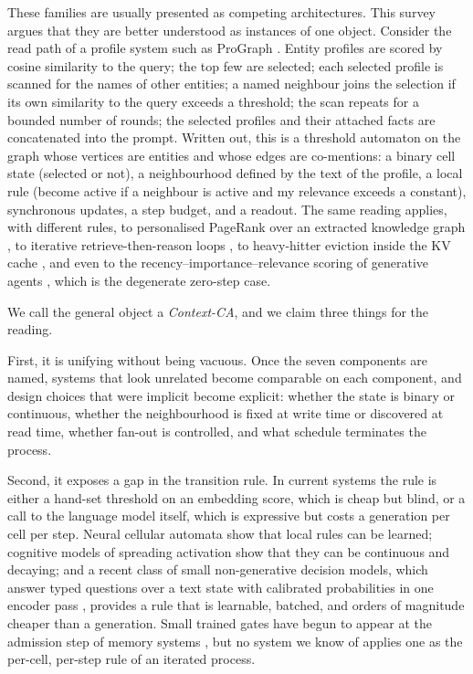 \documentclass[11pt]{article}
\begin{document}
These families are usually presented as competing architectures. This survey argues that they are better understood as instances of one object. Consider the read path of a profile system such as ProGraph \cite{prograph}. Entity profiles are scored by cosine similarity to the query; the top few are selected; each selected profile is scanned for the names of other entities; a named neighbour joins the selection if its own similarity to the query exceeds a threshold; the scan repeats for a bounded number of rounds; the selected profiles and their attached facts are concatenated into the prompt. Written out, this is a threshold automaton on the graph whose vertices are entities and whose edges are co-mentions: a binary cell state (selected or not), a neighbourhood defined by the text of the profile, a local rule (become active if a neighbour is active and my relevance exceeds a constant), synchronous updates, a step budget, and a readout. The same reading applies, with different rules, to personalised PageRank over an extracted knowledge graph \cite{hipporag}, to iterative retrieve-then-reason loops \cite{ircot,selfask}, to heavy-hitter eviction inside the KV cache \cite{h2o,snapkv}, and even to the recency--importance--relevance scoring of generative agents \cite{generativeagents}, which is the degenerate zero-step case.

We call the general object a \emph{Context-CA}, and we claim three things for the reading.

First, it is unifying without being vacuous. Once the seven components are named, systems that look unrelated become comparable on each component, and design choices that were implicit become explicit: whether the state is binary or continuous, whether the neighbourhood is fixed at write time or discovered at read time, whether fan-out is controlled, and what schedule terminates the process.

Second, it exposes a gap in the transition rule. In current systems the rule is either a hand-set threshold on an embedding score, which is cheap but blind, or a call to the language model itself, which is expressive but costs a generation per cell per step. Neural cellular automata \cite{nca,gnca} show that local rules can be learned; cognitive models of spreading activation \cite{collins1975,anderson1983} show that they can be continuous and decaying; and a recent class of small non-generative decision models, which answer typed questions over a text state with calibrated probabilities in one encoder pass \cite{laya,modernbert}, provides a rule that is learnable, batched, and orders of magnitude cheaper than a generation. Small trained gates have begun to appear at the admission step of memory systems \cite{memgate,lightmem-slm}, but no system we know of applies one as the per-cell, per-step rule of an iterated process.
\end{document}
